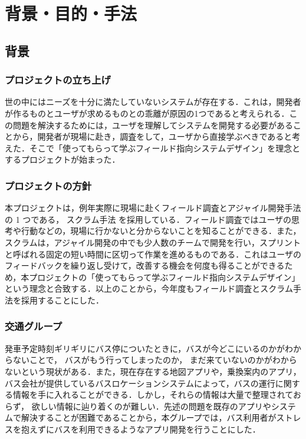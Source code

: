 \chapter{背景・目的・手法}

\section{背景}
\subsection{プロジェクトの立ち上げ}
世の中にはニーズを十分に満たしていないシステムが存在する．これは，開発者が作るものとユーザが求めるものとの乖離が原因の1つであると考えられる．この問題を解決するためには，ユーザを理解してシステムを開発する必要があることから，開発者が現場に赴き，調査をして，ユーザから直接学ぶべきであると考えた．そこで「使ってもらって学ぶフィールド指向システムデザイン」を理念とするプロジェクトが始まった．

\subsection{プロジェクトの方針}
本プロジェクトは，例年実際に現場に赴くフィールド調査とアジャイル開発手法の 1 つである，
スクラム手法 \cite{scrum}を採用している．フィールド調査ではユーザの思考や行動などの，現場に行かないと分からないことを知ることができる．また，スクラムは，アジャイル開発の中でも少人数のチームで開発を行い，スプリントと呼ばれる固定の短い時間に区切って作業を進めるものである\cite{scrum}．これはユーザのフィードバックを繰り返し受けて，改善する機会を何度も得ることができるため，本プロジェクトの「使ってもらって学ぶフィールド指向システムデザイン」という理念と合致する．以上のことから，今年度もフィールド調査とスクラム手法を採用することにした．

\subsection{交通グループ}\label{sec:gaiyou}
発車予定時刻ギリギリにバス停についたときに，バスが今どこにいるのかがわからないことで， バスがもう行ってしまったのか， まだ来ていないのかがわからないという現状がある．また，現在存在する地図アプリや，乗換案内のアプリ，バス会社が提供しているバスロケーションシステムによって，バスの運行に関する情報を手に入れることができる．しかし，それらの情報は大量で整理されておらず， 欲しい情報に辿り着くのが難しい．先述の問題を既存のアプリやシステムで解決することが困難であることから，本グループでは，バス利用者がストレスを抱えずにバスを利用できるようなアプリ開発を行うことにした．

